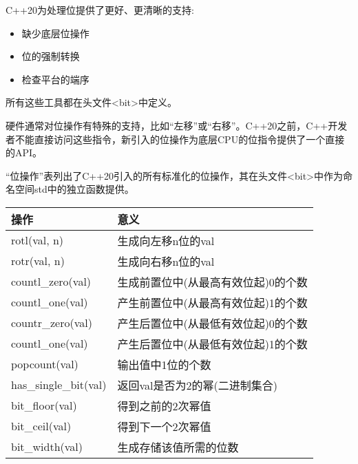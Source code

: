 
C++20为处理位提供了更好、更清晰的支持:

\begin{itemize}
\item
缺少底层位操作

\item
位的强制转换

\item
检查平台的端序
\end{itemize}

所有这些工具都在头文件<bit>中定义。


硬件通常对位操作有特殊的支持，比如“左移”或“右移”。C++20之前，C++开发者不能直接访问这些指令，新引入的位操作为底层CPU的位指令提供了一个直接的API。

“位操作”表列出了C++20引入的所有标准化的位操作，其在头文件<bit>中作为命名空间std中的独立函数提供。

\begin{longtable}[c]{|l|l|}
\hline
\textbf{操作}    & \textbf{意义}                                    \\ \hline
\endfirsthead
%
\endhead
%
rotl(val, n)          & 生成向左移n位的val          \\ \hline
rotr(val, n)          & 生成向右移n位的val         \\ \hline
countl\_zero(val)     & 生成前置位中(从最高有效位起)0的个数   \\ \hline
countl\_one(val)      & 产生前置位中(从最高有效位起)1的个数   \\ \hline
countr\_zero(val)     & 产生后置位中(从最低有效位起)0的个数 \\ \hline
countl\_one(val)      & 产生后置位中(从最低有效位起)1的个数 \\ \hline
popcount(val)         & 输出值中1位的个数                \\ \hline
has\_single\_bit(val) & 返回val是否为2的幂(二进制集合)    \\ \hline
bit\_floor(val)       & 得到之前的2次幂值                  \\ \hline
bit\_ceil(val)        & 得到下一个2次幂值                      \\ \hline
bit\_width(val)       & 生成存储该值所需的位数  \\ \hline
\end{longtable}

